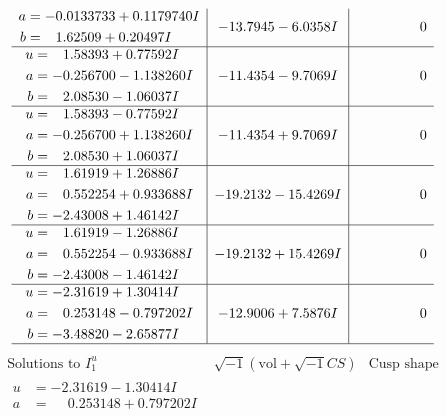 \documentclass[1p]{elsarticle_modified}
\theoremstyle{definition}
\newcommand{\I}{\sqrt{-1}}
\begin{document}
$$\begin{array}{c|c|c}
\begin{aligned}
a &= -0.0133733 + 0.1179740 I \\
b &= \phantom{-}1.62509 + 0.20497 I\end{aligned}
 & -13.7945 - 6.0358 I & \phantom{-0.000000 } 0 \\ \hline\begin{aligned}
u &= \phantom{-}1.58393 + 0.77592 I \\
a &= -0.256700 - 1.138260 I \\
b &= \phantom{-}2.08530 - 1.06037 I\end{aligned}
 & -11.4354 - 9.7069 I & \phantom{-0.000000 } 0 \\ \hline\begin{aligned}
u &= \phantom{-}1.58393 - 0.77592 I \\
a &= -0.256700 + 1.138260 I \\
b &= \phantom{-}2.08530 + 1.06037 I\end{aligned}
 & -11.4354 + 9.7069 I & \phantom{-0.000000 } 0 \\ \hline\begin{aligned}
u &= \phantom{-}1.61919 + 1.26886 I \\
a &= \phantom{-}0.552254 + 0.933688 I \\
b &= -2.43008 + 1.46142 I\end{aligned}
 & -19.2132 - 15.4269 I & \phantom{-0.000000 } 0 \\ \hline\begin{aligned}
u &= \phantom{-}1.61919 - 1.26886 I \\
a &= \phantom{-}0.552254 - 0.933688 I \\
b &= -2.43008 - 1.46142 I\end{aligned}
 & -19.2132 + 15.4269 I & \phantom{-0.000000 } 0 \\ \hline\begin{aligned}
u &= -2.31619 + 1.30414 I \\
a &= \phantom{-}0.253148 - 0.797202 I \\
b &= -3.48820 - 2.65877 I\end{aligned}
 & -12.9006 + 7.5876 I & \phantom{-0.000000 } 0\\
 \hline 
 \end{array}$$\newpage$$\begin{array}{c|c|c}  
\text{Solutions to }I^u_{1}& \I (\text{vol} + \sqrt{-1}CS) & \text{Cusp shape}\\
 \hline 
\begin{aligned}
u &= -2.31619 - 1.30414 I \\
a &= \phantom{-}0.253148 + 0.797202 I \\

\end{aligned}
\end{array}$$
\end{document}
